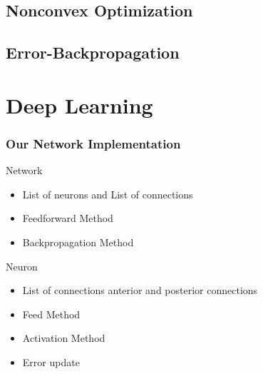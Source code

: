 \documentclass{beamer}
\begin{document}
    \subsection{Nonconvex Optimization}
    \subsection{Error-Backpropagation}

\section{Deep Learning}



\begin{frame}
\frametitle{Our Network Implementation}
\begin{block}{Network}
    \begin{itemize}
        \item List of neurons and List of connections
        \item Feedforward Method
        \item Backpropagation Method
    \end{itemize}
\end{block}

\begin{block}{Neuron}
    \begin{itemize}
        \item List of connections anterior and posterior connections
        \item Feed Method
        \item Activation Method
        \item Error update
    \end{itemize}
\end{block}
\end{frame}

\end{document}
